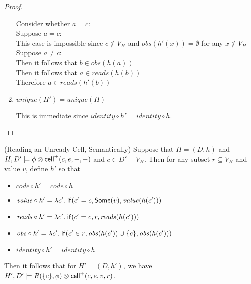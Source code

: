 \begin{proof}
\begin{enumerate}
\begin{tabbedproof}
    \oooo Consider whether $a = c$: \\
    \oooo Suppose $a = c$: \\
    \ooooo This case is impossible since $c \not\in V_H$ and $\mathit{obs}(h'(x)) = \emptyset$ for any $x \not\in V_H$ \\
    \oooo Suppose $a \not= c$: \\
    \ooooo Then it follows that $b \in \mathit{obs}(h(a))$ \\
    \ooooo Then it follows that $a \in \mathit{reads}(h(b))$ \\
    \ooooo Therefore $a \in \mathit{reads}(h'(b))$ 
  \end{tabbedproof}

\item $\mathit{unique}(H') = \mathit{unique}(H)$

This is immediate since $\mathit{identity} \circ h' = \mathit{identity} \circ h$.
\end{enumerate}
\end{proof}

\begin{lemma}{(Reading an Unready Cell, Semantically)}
Suppose that $H = (D,h)$ and $H, D' \models \phi \otimes
\mathsf{cell}^{\pm}({c}, {e}, {-}, {-})$ and $c \in D' - V_H$. Then for any subset $r
\subseteq V_H$ and value $v$, define $h'$ so that
\begin{itemize}
\item $\mathit{code} \circ h' = \mathit{code} \circ h$ 
\item $\mathit{value} \circ h' = \lambda c'.\;\mathsf{if}({c' = c}, {\mathsf{Some}(v)}, {\mathit{value}(h(c'))})$ 
\item $\mathit{reads} \circ h' = \lambda c'.\;\mathsf{if}({c' = c}, {r}, {\mathit{reads}(h(c'))})$ 
\item $\mathit{obs} \circ h' = \lambda c'.\;\mathsf{if}({c' \in r}, {\mathit{obs}(h(c')) \cup \{{c}\}}, {\mathit{obs}(h(c'))})$ 
\item $\mathit{identity} \circ h' = \mathit{identity} \circ h$
\end{itemize}
Then it follows that for $H' = (D,h')$, we have $H', D' \models R(\{{c}\}, \phi) \otimes \mathsf{cell}^{+}({c}, {e}, {v}, {r})$.
\end{lemma}

